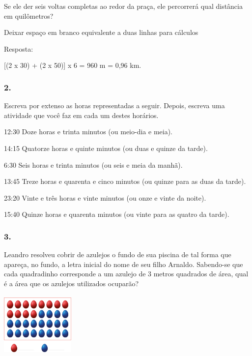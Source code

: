 \begin{enumerate}
\begin{escolha}
\begin{enumerate}
\begin{itemize}
\begin{itemize}
\begin{escolha}
Se ele der seis voltas completas ao redor da praça, ele percorrerá qual
distância em quilômetros?

Deixar espaço em branco equivalente a duas linhas para cálculos

Resposta:

[(2 x 30) + (2 x 50)] x 6 = 960 m = 0,96 km.


\subsubsection{2.}\label{section-53}

Escreva por extenso as horas representadas a seguir. Depois, escreva uma atividade que você faz em cada um destes horários.

\begin{escolha}
  \item 12:30
  Doze horas e trinta minutos (ou meio-dia e meia).
  \item 14:15
  Quatorze horas e quinte minutos (ou duas e quinze da tarde).
  \item 6:30
  Seis horas e trinta minutos (ou seis e meia da manhã).
  \item 13:45
  Treze horas e quarenta e cinco minutos (ou quinze para as duas da tarde).
  \item 23:20
  Vinte e três horas e vinte minutos (ou onze e vinte da noite).
  \item 15:40
  Quinze horas e quarenta minutos (ou vinte para as quatro da tarde).
\end{escolha}

\subsubsection{3.}\label{section-54}

Leandro resolveu cobrir de azulejos o fundo de sua piscina de tal forma
que apareça, no fundo, a letra inicial do nome de seu filho Arnaldo.
Sabendo-se que cada quadradinho corresponde a um azulejo de 3 metros
quadrados de área, qual é a área que os azulejos utilizados
ocuparão?

\includegraphics[width=1.42949in,height=1.25160in]{media/image63.png}


\end{escolha}
\end{itemize}
\end{itemize}
\end{enumerate}
\end{escolha}
\end{enumerate}
